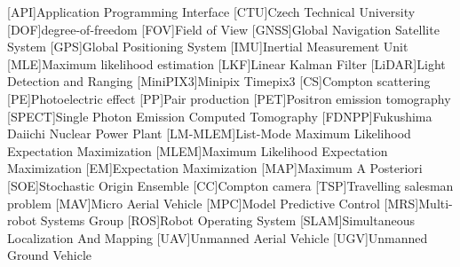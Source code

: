 
\begin{acronym}
  [API]{Application Programming Interface}
  [CTU]{Czech Technical University}
  [DOF]{degree-of-freedom}
  [FOV]{Field of View}
  [GNSS]{Global Navigation Satellite System}
  [GPS]{Global Positioning System}
  [IMU]{Inertial Measurement Unit}
  [MLE]{Maximum likelihood estimation}  
  [LKF]{Linear Kalman Filter}
  [LiDAR]{Light Detection and Ranging}
  [MiniPIX3]{Minipix Timepix3}
  [CS]{Compton scattering}
  [PE]{Photoelectric effect}
  [PP]{Pair production}
  [PET]{Positron emission tomography}
  [SPECT]{Single Photon Emission Computed Tomography}
  [FDNPP]{Fukushima Daiichi Nuclear Power Plant}
  [LM-MLEM]{List-Mode Maximum Likelihood Expectation Maximization}
  [MLEM]{Maximum Likelihood Expectation Maximization}
  [EM]{Expectation Maximization}
  [MAP]{Maximum A Posteriori}
  [SOE]{Stochastic Origin Ensemble}
  [CC]{Compton camera}
  [TSP]{Travelling salesman problem}
  [MAV]{Micro Aerial Vehicle}
  [MPC]{Model Predictive Control}
  [MRS]{Multi-robot Systems Group}
  [ROS]{Robot Operating System}
  [SLAM]{Simultaneous Localization And Mapping}
  [UAV]{Unmanned Aerial Vehicle}
  [UGV]{Unmanned Ground Vehicle}
\end{acronym}
